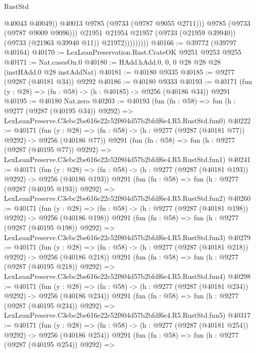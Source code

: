 \begin{lexlean}{RustStd}
\begin{coremodule}
                              @40043
                              @40049))
                          @40013
                          @9785
                          (@9733 (@9787 @9055 @2711)))
                        @9785
                        (@9733 (@9787 @9009 @9096)))
                      @21951
                      @21954
                      @21957
                      (@9733 (@21959 @39940))
                      (@9733 (@21963 @39940 @11))
                      @21972)))))))))
@40166 := @39772 (@39797 @40164)
@40170 := LexLeanPreservation.Rust.CrateOK @9251 @9253 @9255
@40171 := Nat.casesOn.{0}
@40180 := HAdd.hAdd.{0, 0, 0} @28 @28 @28 (instHAdd.{0} @28 instAddNat)
@40181 := @40180 @9335
@40185 := @9277 (@9287 (@40181 @34)) @9292
@40186 := @40180 @9333
@40193 := @40171 (fun (y : @28) => (fn : @58) -> (h : @40185) -> @9256 (@40186 @34)) @9291
@40195 := @40180 Nat.zero
@40203 := @40193
    (fun (fn : @58) =>
    fun (h : @9277 (@9287 (@40195 @34)) @9292) =>
    LexLeanPreserve.C3ebc2be616e22c52f804d57b2bfdf6e4.R5.RustStd.fun0)
@40222 := @40171
    (fun (y : @28) => (fn : @58) -> (h : @9277 (@9287 (@40181 @77)) @9292) -> @9256 (@40186 @77))
    @9291
    (fun (fn : @58) =>
    fun (h : @9277 (@9287 (@40195 @77)) @9292) =>
    LexLeanPreserve.C3ebc2be616e22c52f804d57b2bfdf6e4.R5.RustStd.fun1)
@40241 := @40171
    (fun (y : @28) => (fn : @58) -> (h : @9277 (@9287 (@40181 @193)) @9292) -> @9256 (@40186 @193))
    @9291
    (fun (fn : @58) =>
    fun (h : @9277 (@9287 (@40195 @193)) @9292) =>
    LexLeanPreserve.C3ebc2be616e22c52f804d57b2bfdf6e4.R5.RustStd.fun2)
@40260 := @40171
    (fun (y : @28) => (fn : @58) -> (h : @9277 (@9287 (@40181 @198)) @9292) -> @9256 (@40186 @198))
    @9291
    (fun (fn : @58) =>
    fun (h : @9277 (@9287 (@40195 @198)) @9292) =>
    LexLeanPreserve.C3ebc2be616e22c52f804d57b2bfdf6e4.R5.RustStd.fun3)
@40279 := @40171
    (fun (y : @28) => (fn : @58) -> (h : @9277 (@9287 (@40181 @218)) @9292) -> @9256 (@40186 @218))
    @9291
    (fun (fn : @58) =>
    fun (h : @9277 (@9287 (@40195 @218)) @9292) =>
    LexLeanPreserve.C3ebc2be616e22c52f804d57b2bfdf6e4.R5.RustStd.fun4)
@40298 := @40171
    (fun (y : @28) => (fn : @58) -> (h : @9277 (@9287 (@40181 @234)) @9292) -> @9256 (@40186 @234))
    @9291
    (fun (fn : @58) =>
    fun (h : @9277 (@9287 (@40195 @234)) @9292) =>
    LexLeanPreserve.C3ebc2be616e22c52f804d57b2bfdf6e4.R5.RustStd.fun5)
@40317 := @40171
    (fun (y : @28) => (fn : @58) -> (h : @9277 (@9287 (@40181 @254)) @9292) -> @9256 (@40186 @254))
    @9291
    (fun (fn : @58) =>
    fun (h : @9277 (@9287 (@40195 @254)) @9292) =>

\end{coremodule}
\end{lexlean}
